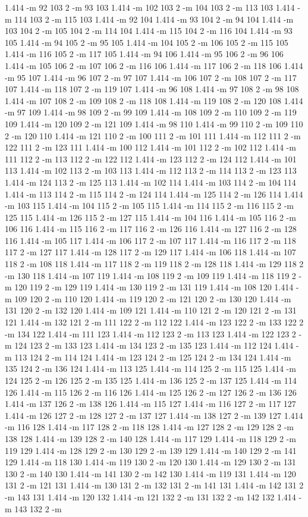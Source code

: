 \documentclass[12pt]{article}
\begin{document}
1.414 -m 92 103 2 -m 93 103 1.414 -m 102 103 2 -m 104 103 2 -m 113 103 1.414 -m 114 103 2 -m 115 103 1.414 -m 92 104 1.414 -m 93 104 2 -m 94 104 1.414 -m 103 104 2 -m 105 104 2 -m 114 104 1.414 -m 115 104 2 -m 116 104 1.414 -m 93 105 1.414 -m 94 105 2 -m 95 105 1.414 -m 104 105 2 -m 106 105 2 -m 115 105 1.414 -m 116 105 2 -m 117 105 1.414 -m 94 106 1.414 -m 95 106 2 -m 96 106 1.414 -m 105 106 2 -m 107 106 2 -m 116 106 1.414 -m 117 106 2 -m 118 106 1.414 -m 95 107 1.414 -m 96 107 2 -m 97 107 1.414 -m 106 107 2 -m 108 107 2 -m 117 107 1.414 -m 118 107 2 -m 119 107 1.414 -m 96 108 1.414 -m 97 108 2 -m 98 108 1.414 -m 107 108 2 -m 109 108 2 -m 118 108 1.414 -m 119 108 2 -m 120 108 1.414 -m 97 109 1.414 -m 98 109 2 -m 99 109 1.414 -m 108 109 2 -m 110 109 2 -m 119 109 1.414 -m 120 109 2 -m 121 109 1.414 -m 98 110 1.414 -m 99 110 2 -m 109 110 2 -m 120 110 1.414 -m 121 110 2 -m 100 111 2 -m 101 111 1.414 -m 112 111 2 -m 122 111 2 -m 123 111 1.414 -m 100 112 1.414 -m 101 112 2 -m 102 112 1.414 -m 111 112 2 -m 113 112 2 -m 122 112 1.414 -m 123 112 2 -m 124 112 1.414 -m 101 113 1.414 -m 102 113 2 -m 103 113 1.414 -m 112 113 2 -m 114 113 2 -m 123 113 1.414 -m 124 113 2 -m 125 113 1.414 -m 102 114 1.414 -m 103 114 2 -m 104 114 1.414 -m 113 114 2 -m 115 114 2 -m 124 114 1.414 -m 125 114 2 -m 126 114 1.414 -m 103 115 1.414 -m 104 115 2 -m 105 115 1.414 -m 114 115 2 -m 116 115 2 -m 125 115 1.414 -m 126 115 2 -m 127 115 1.414 -m 104 116 1.414 -m 105 116 2 -m 106 116 1.414 -m 115 116 2 -m 117 116 2 -m 126 116 1.414 -m 127 116 2 -m 128 116 1.414 -m 105 117 1.414 -m 106 117 2 -m 107 117 1.414 -m 116 117 2 -m 118 117 2 -m 127 117 1.414 -m 128 117 2 -m 129 117 1.414 -m 106 118 1.414 -m 107 118 2 -m 108 118 1.414 -m 117 118 2 -m 119 118 2 -m 128 118 1.414 -m 129 118 2 -m 130 118 1.414 -m 107 119 1.414 -m 108 119 2 -m 109 119 1.414 -m 118 119 2 -m 120 119 2 -m 129 119 1.414 -m 130 119 2 -m 131 119 1.414 -m 108 120 1.414 -m 109 120 2 -m 110 120 1.414 -m 119 120 2 -m 121 120 2 -m 130 120 1.414 -m 131 120 2 -m 132 120 1.414 -m 109 121 1.414 -m 110 121 2 -m 120 121 2 -m 131 121 1.414 -m 132 121 2 -m 111 122 2 -m 112 122 1.414 -m 123 122 2 -m 133 122 2 -m 134 122 1.414 -m 111 123 1.414 -m 112 123 2 -m 113 123 1.414 -m 122 123 2 -m 124 123 2 -m 133 123 1.414 -m 134 123 2 -m 135 123 1.414 -m 112 124 1.414 -m 113 124 2 -m 114 124 1.414 -m 123 124 2 -m 125 124 2 -m 134 124 1.414 -m 135 124 2 -m 136 124 1.414 -m 113 125 1.414 -m 114 125 2 -m 115 125 1.414 -m 124 125 2 -m 126 125 2 -m 135 125 1.414 -m 136 125 2 -m 137 125 1.414 -m 114 126 1.414 -m 115 126 2 -m 116 126 1.414 -m 125 126 2 -m 127 126 2 -m 136 126 1.414 -m 137 126 2 -m 138 126 1.414 -m 115 127 1.414 -m 116 127 2 -m 117 127 1.414 -m 126 127 2 -m 128 127 2 -m 137 127 1.414 -m 138 127 2 -m 139 127 1.414 -m 116 128 1.414 -m 117 128 2 -m 118 128 1.414 -m 127 128 2 -m 129 128 2 -m 138 128 1.414 -m 139 128 2 -m 140 128 1.414 -m 117 129 1.414 -m 118 129 2 -m 119 129 1.414 -m 128 129 2 -m 130 129 2 -m 139 129 1.414 -m 140 129 2 -m 141 129 1.414 -m 118 130 1.414 -m 119 130 2 -m 120 130 1.414 -m 129 130 2 -m 131 130 2 -m 140 130 1.414 -m 141 130 2 -m 142 130 1.414 -m 119 131 1.414 -m 120 131 2 -m 121 131 1.414 -m 130 131 2 -m 132 131 2 -m 141 131 1.414 -m 142 131 2 -m 143 131 1.414 -m 120 132 1.414 -m 121 132 2 -m 131 132 2 -m 142 132 1.414 -m 143 132 2 -m 
\end{document}
